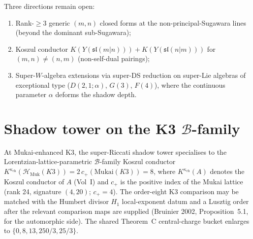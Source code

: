 \begin{remark}
\label{rem:super-riccati-open-questions}
Three directions remain open:
\begin{enumerate}[label=\textup{(\roman*)},nosep]
\item Rank-$\ge 3$ generic $(m, n)$ closed forms at the
 non-principal-Sugawara lines (beyond the dominant sub-Sugawara);
\item Koszul conductor $K(Y(\mathfrak{sl}(m|n))) + K(Y(\mathfrak{sl}(n|m)))$
 for $(m, n) \ne (n, m)$ (non-self-dual pairings);
\item Super-$W$-algebra extensions via super-DS reduction on
 super-Lie algebras of exceptional type ($D(2, 1; \alpha)$,
 $G(3)$, $F(4)$), where the continuous parameter $\alpha$ deforms the
 shadow depth.
\end{enumerate}
\end{remark}

\section{Shadow tower on the K3 \texorpdfstring{$\mathcal{B}$}{B}-family}
\label{sec:super-riccati-k3-b-family}

\begin{remark}
\label{rem:super-riccati-k3-b-family}
At Mukai-enhanced K3, the super-Riccati shadow tower specialises to the
Lorentzian-lattice-parametric $\mathcal{B}$-family Koszul conductor
$K^{\kappa_{\mathrm{ch}}}(\mathcal{H}_{\mathrm{Muk}}(K3)) =
2\,c_+(\mathrm{Mukai}(K3)) = 8$, where
$K^{\kappa_{\mathrm{ch}}}(A)$ denotes the Koszul conductor of $A$
(Vol~I) and
$c_+$ is the positive index of the Mukai lattice (rank 24,
signature $(4, 20)$; $c_+ = 4$). The order-eight K3 comparison may be
matched with the Humbert divisor \(H_1\) local-exponent datum and a
Lusztig order after the relevant comparison maps are supplied
(Bruinier 2002, Proposition~5.1, for the automorphic side). The shared
Theorem~C central-charge bucket enlarges to $\{0, 8, 13, 250/3, 25/3\}$.
\end{remark}
